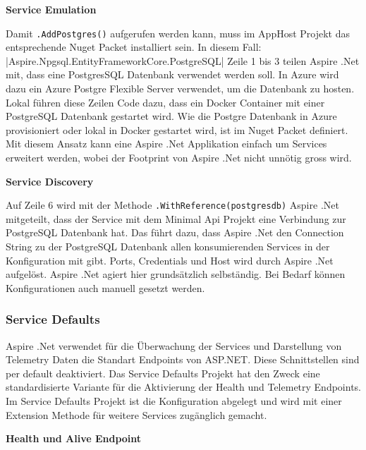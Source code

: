             \textbf{Service Emulation}
            
            Damit \verb|.AddPostgres()| aufgerufen werden kann, muss im AppHost Projekt das entsprechende Nuget Packet installiert sein. In diesem Fall: 
            |Aspire.Npgsql.EntityFrameworkCore.PostgreSQL|
            Zeile 1 bis 3 teilen Aspire .Net mit, dass eine PostgresSQL Datenbank verwendet werden soll. In Azure wird dazu ein Azure Postgre Flexible Server verwendet, um die Datenbank zu hosten. Lokal führen diese Zeilen Code dazu, dass ein Docker Container mit einer PostgreSQL Datenbank gestartet wird. Wie die Postgre Datenbank in Azure provisioniert oder lokal in Docker gestartet wird, ist im Nuget Packet definiert. Mit diesem Ansatz kann eine Aspire .Net Applikation einfach um Services erweitert werden, wobei der Footprint von Aspire .Net nicht unnötig gross wird.

            \textbf{Service Discovery}
            
            Auf Zeile 6 wird mit der Methode \verb|.WithReference(postgresdb)| Aspire .Net mitgeteilt, dass der Service mit dem Minimal Api Projekt eine Verbindung zur PostgreSQL Datenbank hat. Das führt dazu, dass Aspire .Net den Connection String zu der PostgreSQL Datenbank allen konsumierenden Services in der Konfiguration mit gibt. Ports, Credentials und Host wird durch Aspire .Net aufgelöst. Aspire .Net agiert hier grundsätzlich selbständig. Bei Bedarf können Konfigurationen auch manuell gesetzt werden.
            
        \subsubsection{Service Defaults}
            
            Aspire .Net verwendet für die Überwachung der Services und Darstellung von Telemetry Daten die Standart Endpoints von ASP.NET. Diese Schnittstellen sind per default deaktiviert. Das Service Defaults Projekt hat den Zweck eine standardisierte Variante für die Aktivierung der Health und Telemetry Endpoints. Im Service Defaults Projekt ist die Konfiguration abgelegt und wird mit einer Extension Methode für weitere Services zugänglich gemacht.

            \textbf{Health und Alive Endpoint}
            
